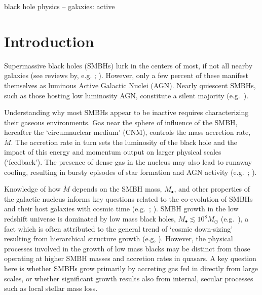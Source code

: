 \documentclass[usenatbib,fleqn]{mn2e}
\newcommand{\Mbh}[1][]{M_{\bullet#1}}
\begin{document}
\begin{keywords}
  black hole physics --  galaxies: active
\end{keywords}


\section{Introduction}
\label{sec:introduction}

Supermassive black holes (SMBHs) lurk in the centers of most, if not
all nearby galaxies (see reviews by,
e.g. \citealt{KormendyRichstone:1995a};
\citealt{FerrareseFord:2005a}). However, only a few percent of these
manifest themselves as luminous Active Galactic Nuclei (AGN).  Nearly
quiescent SMBHs, such as those hosting low luminosity AGN, constitute
a silent majority (e.g.~\citealt{Ho:2009a}).

Understanding why most SMBHs appear to be inactive requires
characterizing their gaseous environments.  Gas near the sphere of
influence of the SMBH, hereafter the `circumnuclear medium' (CNM),
controls the mass accretion rate, $\dot{M}$.  The accretion rate in
turn sets the luminosity of the black hole and the impact of this
energy and momentum output on larger physical scales (`feedback').
The presence of dense gas in the nucleus may also lead to runaway
cooling, resulting in bursty episodes of star formation and AGN
activity (e.g.~\citealt{Ciotti&Ostriker07}; \citealt{Ciotti+10}).

Knowledge of how $\dot{M}$ depends on the SMBH mass, $\Mbh$, and other
properties of the galactic nucleus informs key questions related to
the co-evolution of SMBHs and their host galaxies with cosmic time
(e.g.~\citealt{Kormendy&Ho13}; \citealt{Heckman&Best14}).  SMBH growth
in the low redshift universe is dominated by low mass black holes,
$M_{\bullet} \lesssim 10^{8}M_{\odot}$ (e.g.~\citealt{Heckman+04}), a
fact which is often attributed to the general trend of `cosmic
down-sizing' resulting from hierarchical structure growth (e.g,
\citealt{Gallo+08}).  However, the physical processes involved in the
growth of low mass blacks may be distinct from those operating at
higher SMBH masses and accretion rates in quasars.  A key question
here is whether SMBHs grow primarily by accreting gas fed in directly
from large scales, or whether significant growth results also from
internal, secular processes such as local stellar mass loss.
\end{document}
